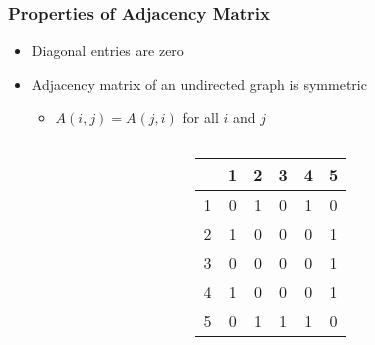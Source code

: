 \documentclass[newPxFont,sthlmFooter,nooffset]{beamer}
\begin{document}
\begin{frame}[t]
  \frametitle{Properties of Adjacency Matrix}
  \begin{itemize}
  \item Diagonal entries are zero
  \item Adjacency matrix of an undirected graph is symmetric
    \begin{itemize}
    \item $A(i, j) = A(j, i)$ for all $i$ and $j$
    \end{itemize}
  \end{itemize}
    \begin{columns}
      \begin{column}{0.4\textwidth}
      \end{column}
      \begin{column}{0.4\textwidth}
\begin{tabular}{c | c c c c c }
  ~ & 1 & 2 & 3 & 4 & 5 \\ \hline
  1 & \cellcolor{blue!25}0 & 1 & 0 & 1 & 0 \\ 
  2 & 1 & \cellcolor{blue!25}0 & 0 & 0 & 1 \\
  3 & 0 & 0 & \cellcolor{blue!25}0 & 0 & 1 \\
  4 & 1 & 0 & 0 & \cellcolor{blue!25}0 & 1 \\
  5 & 0 & 1 & 1 & 1 & \cellcolor{blue!25}0 
\end{tabular}        
      \end{column}
    \end{columns}
\end{frame}
\end{document}
